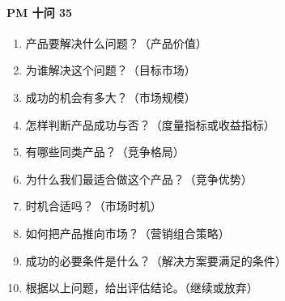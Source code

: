 \documentclass[letterpaper,11pt,english]{sphinxmanual}
\begin{document}
\paragraph{PM 十问 35\sphinxfootnotemark[169]}
\label{\detokenize{chapter_introduction/PM:pm-35}}%
\begin{footnotetext}[169]\sphinxAtStartFootnote
{}
%
\end{footnotetext}\ignorespaces \begin{enumerate}
%
\item {} 
产品要解决什么问题？（产品价值）

\item {} 
为谁解决这个问题？（目标市场）

\item {} 
成功的机会有多大？（市场规模）

\item {} 
怎样判断产品成功与否？（度量指标或收益指标）

\item {} 
有哪些同类产品？（竞争格局）

\item {} 
为什么我们最适合做这个产品？（竞争优势）

\item {} 
时机合适吗？（市场时机）

\item {} 
如何把产品推向市场？（营销组合策略）

\item {} 
成功的必要条件是什么？（解决方案要满足的条件）

\item {} 
根据以上问题，给出评估结论。（继续或放弃）

\end{enumerate}
\end{document}
